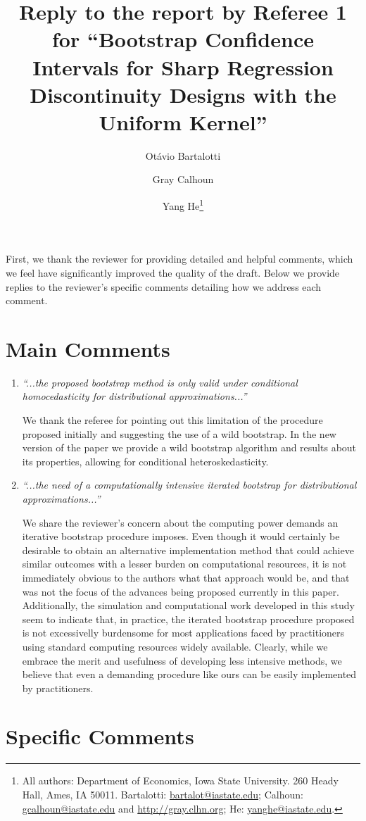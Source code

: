 \documentclass[12pt,fleqn]{article}
\title{Reply to the report by Referee 1 for ``Bootstrap Confidence Intervals for Sharp Regression Discontinuity Designs
  with the Uniform Kernel''}
\author{Ot\'avio Bartalotti \and Gray Calhoun \and Yang He\thanks{%
  All authors: Department of Economics, Iowa State University.
  260 Heady Hall, Ames, IA 50011.
  Bartalotti: \protect\url{bartalot@iastate.edu};
  Calhoun: \protect\url{gcalhoun@iastate.edu} and
  \protect\url{http://gray.clhn.org};
  He: \protect\url{yanghe@iastate.edu}.}}
\begin{document}
\maketitle

First, we thank the reviewer for providing detailed and helpful comments, which we feel have significantly improved the quality of the draft.  Below we provide replies to the reviewer’s specific comments detailing how we address each comment.

\section{Main Comments}

\begin{enumerate}
 \item \textit{``...the proposed bootstrap method is only valid under conditional homocedasticity for distributional approximations...''}

  We thank the referee for pointing out this limitation of the procedure proposed initially and suggesting the use of a wild bootstrap. In the new version of the paper we provide a wild bootstrap algorithm and results about its properties, allowing for conditional heteroskedasticity.

\item \textit{``...the need of a computationally intensive iterated bootstrap for distributional approximations...''}

   We share the reviewer's concern about the computing power demands an iterative bootstrap procedure imposes. Even though it would certainly be desirable to obtain an alternative implementation method that could achieve similar outcomes with a lesser burden on computational resources, it is not immediately obvious to the authors what that approach would be, and that was not the focus of the advances being proposed currently in this paper. Additionally, the simulation and computational work developed in this study seem to indicate that, in practice, the iterated bootstrap procedure proposed is not excessivelly burdensome for most applications faced by practitioners using standard computing resources widely available. Clearly, while we embrace the merit and usefulness of developing less intensive methods, we believe that even a demanding procedure like ours can be easily implemented by practitioners.
\end{enumerate}

\section{Specific Comments}
\end{document}
